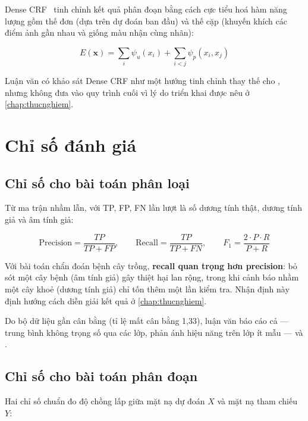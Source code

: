 Dense CRF~\cite{krahenbuhl2011densecrf} tinh chỉnh kết quả phân đoạn bằng cách
cực tiểu hoá hàm năng lượng gồm thế đơn (dựa trên dự đoán ban đầu) và thế cặp
(khuyến khích các điểm ảnh gần nhau và giống màu nhận cùng nhãn):

\begin{equation}
    E(\mathbf{x}) = \sum_{i} \psi_u(x_i) + \sum_{i < j} \psi_p(x_i, x_j)
    \label{eq:crf}
\end{equation}

Luận văn có khảo sát Dense CRF như một hướng tinh chỉnh thay thế cho \SAM{}, nhưng
không đưa vào quy trình cuối vì lý do triển khai được nêu ở \cref{chap:thucnghiem}.

\section{Chỉ số đánh giá}
\label{sec:metrics}

\subsection{Chỉ số cho bài toán phân loại}

Từ ma trận nhầm lẫn, với TP, FP, FN lần lượt là số dương tính thật, dương tính giả
và âm tính giả:

\begin{equation}
    \text{Precision} = \frac{TP}{TP + FP}, \qquad
    \text{Recall} = \frac{TP}{TP + FN}, \qquad
    F_1 = \frac{2 \cdot P \cdot R}{P + R}
    \label{eq:prf}
\end{equation}

Với bài toán chẩn đoán bệnh cây trồng, \textbf{recall quan trọng hơn precision}:
bỏ sót một cây bệnh (âm tính giả) gây thiệt hại lan rộng, trong khi cảnh báo nhầm
một cây khoẻ (dương tính giả) chỉ tốn thêm một lần kiểm tra. Nhận định này định
hướng cách diễn giải kết quả ở \cref{chap:thucnghiem}.

Do bộ dữ liệu gần cân bằng (tỉ lệ mất cân bằng 1,33), luận văn báo cáo cả
 --- trung bình không trọng số qua các lớp, phản ánh hiệu năng
trên lớp ít mẫu --- và .

\subsection{Chỉ số cho bài toán phân đoạn}

Hai chỉ số chuẩn đo độ chồng lấp giữa mặt nạ dự đoán $X$ và mặt nạ tham chiếu $Y$:

